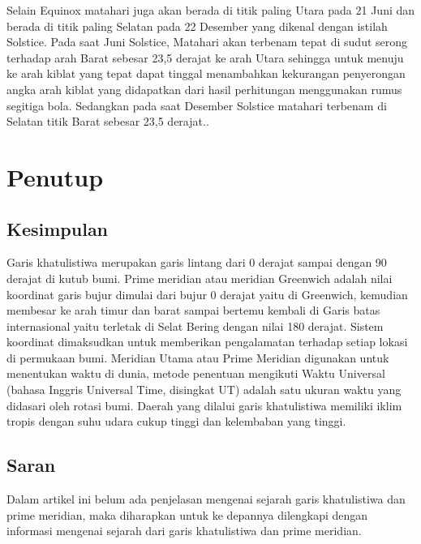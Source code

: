 	Selain Equinox matahari juga akan berada di titik paling Utara pada 21 Juni dan berada di titik paling Selatan pada 22 Desember yang dikenal dengan 
istilah Solstice. Pada saat Juni Solstice, Matahari akan terbenam tepat di sudut serong terhadap arah Barat sebesar 23,5 derajat ke arah Utara
sehingga untuk menuju ke arah kiblat yang tepat dapat tinggal menambahkan kekurangan penyerongan angka arah kiblat yang didapatkan dari hasil perhitungan 
menggunakan rumus segitiga bola. Sedangkan pada saat Desember Solstice matahari terbenam di Selatan titik Barat sebesar 23,5 derajat.\cite {arkanudin2008teknik}.

\section {Penutup}

\subsection{Kesimpulan}
	
	Garis khatulistiwa merupakan garis lintang dari 0 derajat sampai dengan 90 derajat di kutub bumi. Prime meridian atau meridian Greenwich adalah 
nilai koordinat garis bujur dimulai dari bujur 0 derajat yaitu di Greenwich, kemudian membesar ke arah timur dan barat sampai bertemu kembali di Garis batas 
internasional yaitu terletak di Selat Bering dengan nilai 180 derajat. Sistem koordinat dimaksudkan untuk memberikan pengalamatan terhadap setiap lokasi 
di permukaan bumi. Meridian Utama atau Prime Meridian digunakan untuk menentukan waktu di dunia, metode penentuan mengikuti Waktu Universal (bahasa 
Inggris Universal Time, disingkat UT) adalah satu ukuran waktu yang didasari oleh rotasi bumi. Daerah yang dilalui garis khatulistiwa memiliki iklim tropis 
dengan suhu udara cukup tinggi dan kelembaban yang tinggi.

\subsection{Saran}

	Dalam artikel ini belum ada penjelasan mengenai sejarah garis khatulistiwa dan prime meridian, maka diharapkan untuk  ke depannya dilengkapi dengan 
informasi mengenai sejarah dari garis khatulistiwa dan prime meridian.	
